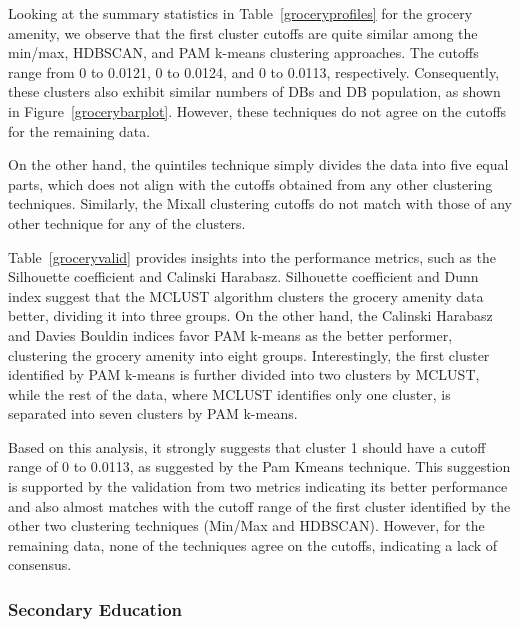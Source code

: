 \documentclass[11pt, a4paper]{article}
\begin{document}
Looking at the summary statistics in Table~\ref{groceryprofiles} for the grocery amenity, we observe that the first cluster cutoffs are quite similar among the min/max, HDBSCAN, and PAM k-means clustering approaches. The cutoffs range from 0 to 0.0121, 0 to 0.0124, and 0 to 0.0113, respectively. Consequently, these clusters also exhibit similar numbers of DBs and DB population, as shown in Figure~\ref{grocerybarplot}. However, these techniques do not agree on the cutoffs for the remaining data.
\par
On the other hand, the quintiles technique simply divides the data into five equal parts, which does not align with the cutoffs obtained from any other clustering techniques. Similarly, the Mixall clustering cutoffs do not match with those of any other technique for any of the clusters.
\par
Table~\ref{groceryvalid} provides insights into the performance metrics, such as the Silhouette coefficient and Calinski Harabasz. Silhouette coefficient and Dunn index suggest that the MCLUST algorithm clusters the grocery amenity data better, dividing it into three groups. On the other hand, the Calinski Harabasz and Davies Bouldin indices favor PAM k-means as the better performer, clustering the grocery amenity into eight groups. Interestingly, the first cluster identified by PAM k-means is further divided into two clusters by MCLUST, while the rest of the data, where MCLUST identifies only one cluster, is separated into seven clusters by PAM k-means.
\par
Based on this analysis, it strongly suggests that cluster 1 should have a cutoff range of 0 to 0.0113, as suggested by the Pam Kmeans technique. This suggestion is supported by the validation from two metrics indicating its better performance and also almost matches with the cutoff range of the first cluster identified by the other two clustering techniques (Min/Max and HDBSCAN). However, for the remaining data, none of the techniques agree on the cutoffs, indicating a lack of consensus.



\subsubsection{Secondary Education}
\end{document}
